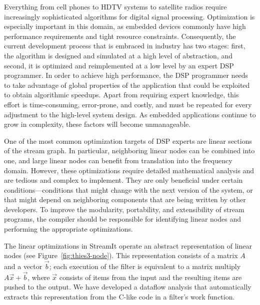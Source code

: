\documentclass{csailabstractbook}
\begin{document}
Everything from cell phones to HDTV systems to satellite radios
require increasingly sophisticated algorithms for digital signal
processing. Optimization is especially important in this domain, as
embedded devices commonly have high performance requirements and tight
resource constraints.  Consequently, the current development process
that is embraced in industry has two stages: first, the algorithm is
designed and simulated at a high level of abstraction, and second, it
is optimized and reimplemented at a low level by an expert DSP
programmer.  In order to achieve high performance, the DSP programmer
needs to take advantage of global properties of the application that
could be exploited to obtain algorithmic speedups. Apart from
requiring expert knowledge, this effort is time-consuming,
error-prone, and costly, and must be repeated for every adjustment to
the high-level system design.  As embedded applications continue to
grow in complexity, these factors will become unmanageable.

One of the most common optimization targets of DSP experts are linear
sections of the stream graph.  In particular, neighboring linear nodes
can be combined into one, and large linear nodes can benefit from
translation into the frequency domain.  However, these optimizations
require detailed mathematical analysis and are tedious and complex to
implement.  They are only beneficial under certain
conditions---conditions that might change with the next version of the
system, or that might depend on neighboring components that are being
written by other developers.  To improve the modularity, portability,
and extensibility of stream programs, the compiler should be
responsible for identifying linear nodes and performing the
appropriate optimizations.


The linear optimizations in StreamIt operate an abstract
representation of linear nodes (see Figure~\ref{fig:thies3-node}).
This representation consists of a matrix $A$ and a vector ${\vec b}$;
each execution of the filter is equivalent to a matrix multiply
$A{\vec x} + {\vec b}$, where ${\vec x}$ consists of items from the
input and the resulting items are pushed to the output.  We have
developed a dataflow analysis that automatically extracts this
representation from the C-like code in a filter's work function.
\end{document}
